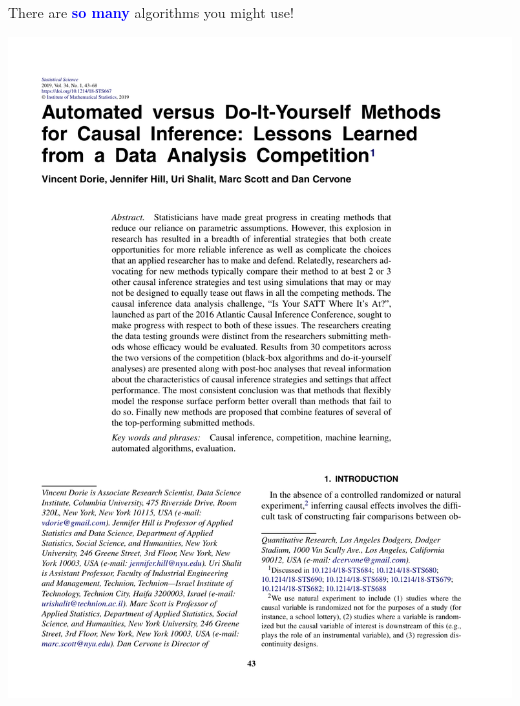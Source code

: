 \documentclass{beamer}
\newcommand\bblue[1]{\textcolor{blue}{\textbf{#1}}}
\begin{document}
\begin{frame}
There are \bblue{so many} algorithms you might use!
\end{frame}

\begin{frame}
\centering
\includegraphics[height = \textheight]{figures/dorie_p1}
\end{frame}
\end{document}
